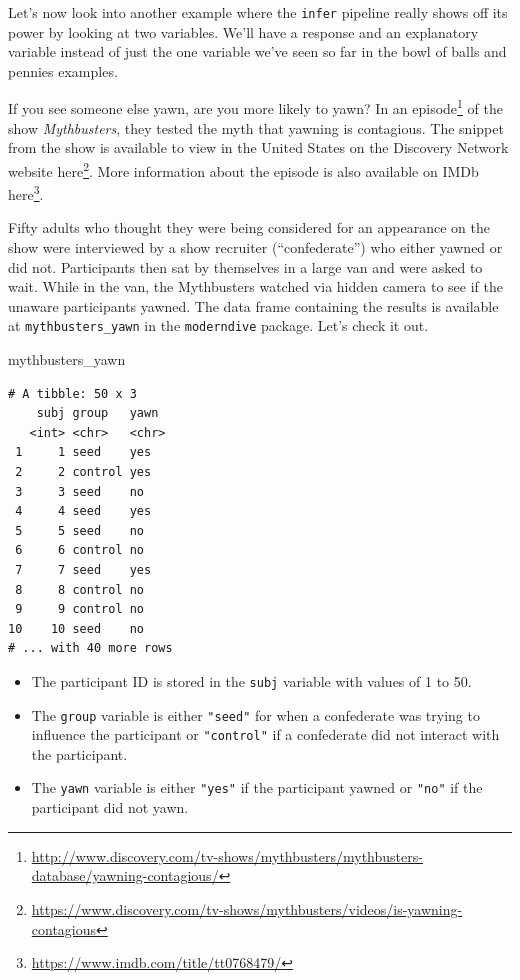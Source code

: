 \documentclass[12pt, krantz2,]{krantz}
\makeatletter
\newenvironment{Shaded}{\begin{snugshade}}{\end{snugshade}}
\newcommand{\NormalTok}[1]{#1}
\providecommand{\tightlist}{%
  \setlength{\itemsep}{0pt}\setlength{\parskip}{0pt}}
\renewcommand{\href}[2]{#2\footnote{\url{#1}}}
\newenvironment{kframe}{%
\medskip{}
\setlength{\fboxsep}{.8em}
 \def\at@end@of@kframe{}%
 \ifinner\ifhmode%
  \def\at@end@of@kframe{\end{minipage}}%
  \begin{minipage}{\columnwidth}%
 \fi\fi%
 \def\FrameCommand##1{\hskip\@totalleftmargin \hskip-\fboxsep
 \colorbox{shadecolor}{##1}\hskip-\fboxsep
     \hskip-\linewidth \hskip-\@totalleftmargin \hskip\columnwidth}%
 \MakeFramed {\advance\hsize-\width
   \@totalleftmargin\z@ \linewidth\hsize
   \@setminipage}}%
 {\par\unskip\endMakeFramed%
 \at@end@of@kframe}
\renewenvironment{Shaded}{\begin{kframe}}{\end{kframe}}
\makeatother
\begin{document}
Let's now look into another example where the \texttt{infer} pipeline really shows off its power by looking at two variables. We'll have a response and an explanatory variable instead of just the one variable we've seen so far in the bowl of balls and pennies examples.

If you see someone else yawn, are you more likely to yawn? In an \href{http://www.discovery.com/tv-shows/mythbusters/mythbusters-database/yawning-contagious/}{episode} of the show \emph{Mythbusters}, they tested the myth that yawning is contagious. The snippet from the show is available to view in the United States on the Discovery Network website \href{https://www.discovery.com/tv-shows/mythbusters/videos/is-yawning-contagious}{here}. More information about the episode is also available on IMDb \href{https://www.imdb.com/title/tt0768479/}{here}.

Fifty adults who thought they were being considered for an appearance on the show were interviewed by a show recruiter (``confederate'') who either yawned or did not. Participants then sat by themselves in a large van and were asked to wait. While in the van, the Mythbusters watched via hidden camera to see if the unaware participants yawned. The data frame containing the results is available at \texttt{mythbusters\_yawn} in the \texttt{moderndive} package. Let's check it out.

\begin{Shaded}
\begin{Highlighting}[]
\NormalTok{mythbusters_yawn}
\end{Highlighting}
\end{Shaded}

\begin{verbatim}
# A tibble: 50 x 3
    subj group   yawn 
   <int> <chr>   <chr>
 1     1 seed    yes  
 2     2 control yes  
 3     3 seed    no   
 4     4 seed    yes  
 5     5 seed    no   
 6     6 control no   
 7     7 seed    yes  
 8     8 control no   
 9     9 control no   
10    10 seed    no   
# ... with 40 more rows
\end{verbatim}

\begin{itemize}
\tightlist
\item
  The participant ID is stored in the \texttt{subj} variable with values of 1 to 50.
\item
  The \texttt{group} variable is either \texttt{"seed"} for when a confederate was trying to influence the participant or \texttt{"control"} if a confederate did not interact with the participant.
\item
  The \texttt{yawn} variable is either \texttt{"yes"} if the participant yawned or \texttt{"no"} if the participant did not yawn.
\end{itemize}
\end{document}

